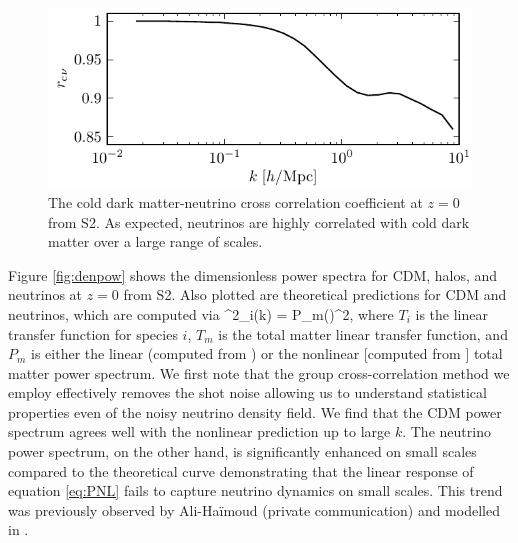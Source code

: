 \begin{figure}[!b]
\begin{center}
\includegraphics[width=\smwidth]{./figures/neutrinos/fig3.pdf} \vspace{-0.1cm}
\caption[Cold dark matter-neutrino cross correlation coefficient]
{The cold dark matter-neutrino cross correlation
coefficient at $z = 0$ from S2. As expected, neutrinos are
highly correlated with cold dark matter over a large range
of scales.}
\label{fig:dencorr}
\end{center}
\end{figure}

Figure \ref{fig:denpow} shows the dimensionless power spectra for CDM, halos, and neutrinos at $z = 0$ from S2.  Also plotted are theoretical predictions for CDM and neutrinos, which are computed via
\bq
\Delta^2_i(k) =   P_m\left(\right)^2,
\label{eq:PNL}
\eq    
where $T_i$ is the linear transfer function for species $i$, $T_m$ is the total matter linear transfer function, and $P_m$ is either the linear (computed from \camb{}) or the nonlinear [computed from \hfit{} \citep{smith/etal:2013}] total matter power spectrum. We first note that the group cross-correlation method we employ effectively removes the shot noise allowing us to understand statistical properties even of the noisy neutrino density field.  We find that the CDM power spectrum agrees well with the nonlinear prediction up to large $k$.  The neutrino power spectrum, on the other hand, is significantly enhanced on small scales compared to the theoretical curve demonstrating that the linear response of equation \ref{eq:PNL} fails to capture neutrino dynamics on small scales.  This trend was previously observed by Ali-Ha{\"i}moud (private communication) and modelled in \citet{massara/etal:2014}.

